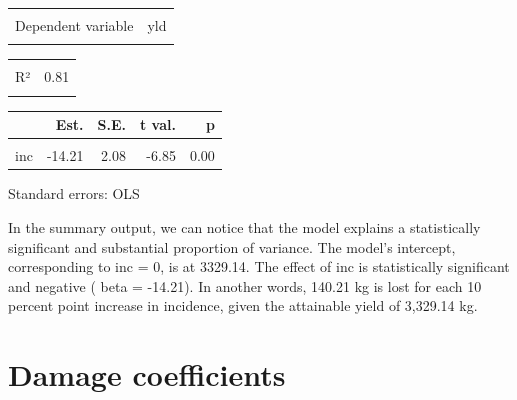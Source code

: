 \documentclass[
  letterpaper,
]{book}
\begin{document}
\begin{table}[!h]
\centering
\begin{tabular}{lr}
\toprule
\cellcolor{gray!6}{Observations} & \cellcolor{gray!6}{13}\\
Dependent variable & yld\\
\cellcolor{gray!6}{Type} & \cellcolor{gray!6}{OLS linear regression}\\
\bottomrule
\end{tabular}
\end{table} \begin{table}[!h]
\centering
\begin{tabular}{lr}
\toprule
\cellcolor{gray!6}{F(1,11)} & \cellcolor{gray!6}{46.86}\\
R² & 0.81\\
\cellcolor{gray!6}{Adj. R²} & \cellcolor{gray!6}{0.79}\\
\bottomrule
\end{tabular}
\end{table} \begin{table}[!h]
\centering
\begin{threeparttable}
\begin{tabular}{lrrrr}
\toprule
  & Est. & S.E. & t val. & p\\
\midrule
\cellcolor{gray!6}{(Intercept)} & \cellcolor{gray!6}{3329.14} & \cellcolor{gray!6}{86.84} & \cellcolor{gray!6}{38.33} & \cellcolor{gray!6}{0.00}\\
inc & -14.21 & 2.08 & -6.85 & 0.00\\
\bottomrule
\end{tabular}
\begin{tablenotes}
\item Standard errors: OLS
\end{tablenotes}
\end{threeparttable}
\end{table}

In the summary output, we can notice that the model explains a
statistically significant and substantial proportion of variance. The
model's intercept, corresponding to inc = 0, is at 3329.14. The effect
of inc is statistically significant and negative ( beta = -14.21). In
another words, 140.21 kg is lost for each 10 percent point increase in
incidence, given the attainable yield of 3,329.14 kg.

\hypertarget{damage-coefficients}{%
\section{Damage coefficients}\label{damage-coefficients}}
\end{document}
